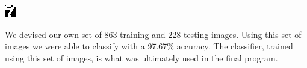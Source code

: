 \begin{center}
\begin{minipage}[h!]{.9\linewidth}
\begin{minipage}[h!]{0.9\textwidth}
\begin{center}
\includegraphics[width=.3\linewidth]{images/mnist4.png}
\end{center}
\end{minipage}
\vspace{5 mm}
\end{minipage}
\end{center}

We devised our own set of 863 training and 228 testing images. Using this set of images we were able to classify with a 97.67\% accuracy. The classifier, trained using this set of images, is what was ultimately used in the final program.

